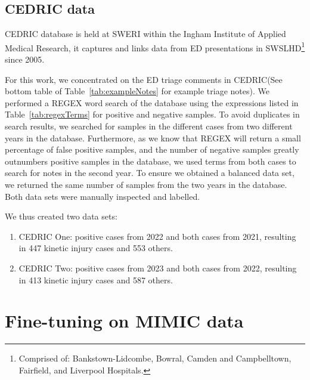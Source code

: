 \documentclass[a4paper,12pt]{article}
\newcommand{\cedric}{\ac{CEDRIC}\xspace}
\newcommand{\inghamOne}{CEDRIC One\xspace}   %
\newcommand{\inghamTwo}{CEDRIC Two\xspace}  %
\begin{document}
\subsection{\cedric data}

\acf{CEDRIC} database is held at \ac{SWERI} within the Ingham Institute of Applied Medical Research, 
it captures and links data from 
\ac{ED} presentations in \ac{SWSLHD}\footnote{Comprised of: Bankstown-Lidcombe, Bowral, Camden and Campbelltown, Fairfield, and Liverpool Hospitals.} 
since 2005. 

For this work, we concentrated on the \ac{ED} triage comments in \cedric (See bottom table of Table~\ref{tab:exampleNotes} for example triage notes). We performed a \ac{REGEX} word search of the database using the expressions listed in Table~\ref{tab:regexTerms} for positive and negative samples. To avoid duplicates in search results, we searched for samples in the different cases from two different years in the database. Furthermore, as we know that \ac{REGEX} will return a small percentage of false positive samples, and the number of negative samples greatly outnumbers positive samples in the database, we used terms from both cases to search for notes in the second year. To ensure we obtained a balanced data set, we returned the same number of samples from the two years in the database. Both data sets were manually inspected and labelled. 

We thus created two data sets: 
\vspace{-2mm}
\begin{enumerate}
    \item \inghamOne : positive cases from 2022 and both cases from 2021, resulting in 447 kinetic injury cases and 553 others. 
    \item \inghamTwo : positive cases from 2023 and both cases from 2022, resulting in 413 kinetic injury cases and 587 others. 
\end{enumerate}







\section{Fine-tuning on MIMIC data}
\end{document}
